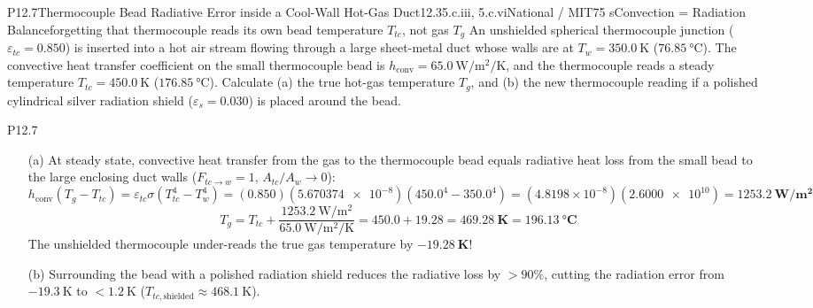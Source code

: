 \begin{problem}{P12.7}{Thermocouple Bead Radiative Error inside a Cool-Wall Hot-Gas Duct}{12.3}{5.c.iii, 5.c.vi}{National / MIT}{75 s}{Convection = Radiation Balance}{forgetting that thermocouple reads its own bead temperature $T_{tc}$, not gas $T_g$}
An unshielded spherical thermocouple junction ($\varepsilon_{tc} = 0.850$) is inserted into a hot air stream flowing through a large sheet-metal duct whose walls are at $T_w = \SI{350.0}{\kelvin}$ ($\SI{76.85}{\celsius}$). The convective heat transfer coefficient on the small thermocouple bead is $h_{\mathrm{conv}} = \SI{65.0}{\watt\per\square\meter\per\kelvin}$, and the thermocouple reads a steady temperature $T_{tc} = \SI{450.0}{\kelvin}$ ($\SI{176.85}{\celsius}$). Calculate (a) the true hot-gas temperature $T_g$, and (b) the new thermocouple reading if a polished cylindrical silver radiation shield ($\varepsilon_s = 0.030$) is placed around the bead.
\end{problem}
\begin{solution}{P12.7}
\begin{enumerate}
  \item[(a)] At steady state, convective heat transfer from the gas to the thermocouple bead equals radiative heat loss from the small bead to the large enclosing duct walls ($F_{tc\to w} = 1$, $A_{tc}/A_w \to 0$):
  \[
    h_{\mathrm{conv}}\left(T_g - T_{tc}\right) = \varepsilon_{tc}\sigma\left(T_{tc}^4 - T_w^4\right) = (0.850)(\num{5.670374e-8})\left(450.0^4 - 350.0^4\right) = (4.8198\times 10^{-8})(\num{2.6000e10}) = \mathbf{\SI{1253.2}{\watt\per\square\meter}}
  \]
  \[
    T_g = T_{tc} + \frac{\SI{1253.2}{\watt\per\square\meter}}{\SI{65.0}{\watt\per\square\meter\per\kelvin}} = 450.0 + 19.28 = \mathbf{\SI{469.28}{\kelvin}} = \mathbf{\SI{196.13}{\celsius}}
  \]
  The unshielded thermocouple under-reads the true gas temperature by $\mathbf{-\SI{19.28}{\kelvin}}$!
  \item[(b)] Surrounding the bead with a polished radiation shield reduces the radiative loss by $>90\%$, cutting the radiation error from $-\SI{19.3}{\kelvin}$ to $<\SI{1.2}{\kelvin}$ ($T_{tc,\mathrm{shielded}} \approx \SI{468.1}{\kelvin}$).
\end{enumerate}
\end{solution}

